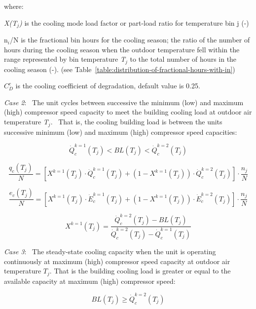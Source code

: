 where:

\emph{X(T\(_{j}\))} is the cooling mode load factor or part-load ratio for temperature bin j (-)

n\(_{i}\)/N is the fractional bin hours for the cooling season; the ratio of the number of hours during the cooling season when the outdoor temperature fell within the range represented by bin temperature \emph{T\(_{j}\)} to the total number of hours in the cooling season (-). (see Table~\ref{table:distribution-of-fractional-hours-with-in})

\(C_D^c\) is the cooling coefficient of degradation, default value is 0.25.

\emph{Case 2}:~ The unit cycles between successive the minimum (low) and maximum (high) compressor speed capacity to meet the building cooling load at outdoor air temperature \emph{T\(_{j}\)}.~ That is, the cooling building load is between the units successive minimum (low) and maximum (high) compressor speed capacities:

\begin{equation}
\dot Q_c^{k = 1}({T_j}) < BL({T_j}) < \dot Q_c^{k = 2}({T_j})
\end{equation}

\begin{equation}
  \frac{{{q_c}({T_j})}}{N} = \left[ {{X^{k = 1}}({T_j}) \cdot \dot Q_c^{k = 1}({T_j}) + \left( {1 - {X^{k = 1}}({T_j})} \right) \cdot \dot Q_c^{k = 2}({T_j})} \right] \cdot \frac{{{n_j}}}{N}
\end{equation}

\begin{equation}
  \frac{{{e_c}({T_j})}}{N} = \left[ {{X^{k = 1}}({T_j}) \cdot \dot E_c^{k = 1}({T_j}) + \left( {1 - {X^{k = 1}}({T_j})} \right) \cdot \dot E_c^{k = 2}({T_j})} \right] \cdot \frac{{{n_j}}}{N}
\end{equation}

\begin{equation}
{X^{k = 1}}({T_j}) = \frac{{\dot Q_c^{k = 2}({T_j}) - BL({T_j})}}{{\dot Q_c^{k = 2}({T_j}) - \dot Q_c^{k = 1}({T_j})}}
\end{equation}

\emph{Case 3}:~ The steady-state cooling capacity when the unit is operating continuously at maximum (high) compressor speed capacity at outdoor air temperature \(T_{j}\). That is the building cooling load is greater or equal to the available capacity at maximum (high) compressor speed:

\begin{equation}
BL({T_j}) \ge \dot Q_c^{k = 2}({T_j})
\end{equation}

